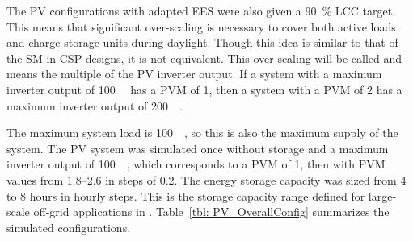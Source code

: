 The \ac{PV} configurations with adapted \ac{EES} were also given a \SI{90}{\percent} \ac{LCC} target. This means that significant over-scaling is necessary to cover both active loads and charge storage units during daylight. Though this idea is similar to that of the \acl{SM} in \ac{CSP} designs, it is not equivalent. This over-scaling will be called  and means the multiple of the \ac{PV} inverter output. If a system with a maximum inverter output of \SI{100}{\mega\wattel} has a \ac{PVM} of \num{1}, then a system with a \ac{PVM} of \num{2} has a maximum inverter output of \SI{200}{\mega\wattel}. 


The maximum system load is \SI{100}{\mega\wattel}, so this is also the maximum supply of the system. The \ac{PV} system was simulated once without storage and a maximum inverter output of \SI{100}{\mega\wattel}, which corresponds to a \ac{PVM} of 1, then with \ac{PVM} values from \numrange{1.8}{2.6} in steps of \num{0.2}. The energy storage capacity was sized from \num{4} to \num{8} hours in hourly steps. This is the storage capacity range defined for large-scale off-grid applications in \cite{IEA2014c}. Table~\ref{tbl: PV_OverallConfig} summarizes the simulated configurations.

